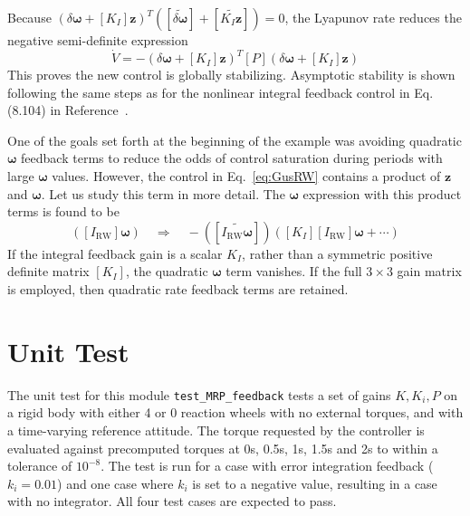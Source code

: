 \documentclass[]{BasiliskReportMemo}
\begin{document}
		Because $(\delta\bm\omega + [K_{I}]\bm z )^{T}  ([\widetilde{\delta\bm\omega}] + [\widetilde{K_{I}\bm z}] ) = 0$, the Lyapunov rate reduces the negative semi-definite expression
		\begin{equation*}
			\dot V = -  (\delta\bm\omega + [K_{I}]\bm z )^{T} [P]  (\delta\bm\omega + [K_{I}]\bm z )
		\end{equation*}
		This proves the new control is globally stabilizing.  Asymptotic stability is shown following the same steps as for the  nonlinear integral feedback control in Eq. (8.104) in Reference~.  
		
		One of the goals set forth at the beginning of the example was avoiding quadratic $\bm\omega$ feedback terms to reduce the odds of control saturation during periods with large $\bm\omega$ values.  However, the control in Eq.~\eqref{eq:GusRW} contains a product of $\bm z$ and $\bm\omega$.  Let us study this term in more detail.  The $\bm\omega$ expression with this product terms is found to be
		\begin{equation*}
			[\widetilde{K_{I}\bm z}] ([I_{\text{RW}}]\bm \omega)
			 \quad \Rightarrow \quad 
			-  (
			[\widetilde{I_{\text{RW}} \bm \omega}] 
			 ) ([K_{I}] [I_{\text{RW}}] \bm \omega + \cdots )
		\end{equation*}
		If the integral feedback gain is a scalar $K_{I}$, rather than a symmetric positive definite matrix $[K_{I}]$, the quadratic $\bm\omega$ term vanishes.  If the full $3\times 3$ gain matrix is employed, then quadratic rate feedback terms are retained.  

\section{Unit Test}
The unit test for this module \verb|test_MRP_feedback| tests a set of gains $K,K_i,P$ on a rigid body with either 4 or 0 reaction wheels with no external torques, and with a time-varying reference attitude. The torque requested by the controller is evaluated against precomputed torques at 0s, 0.5s, 1s, 1.5s and 2s to within a tolerance of $10^{-8}$. The test is run for a case with error integration feedback ($k_i=0.01$) and one case where $k_i$ is set to a negative value, resulting in a case with no integrator. All four test cases are expected to pass.
\end{document}
